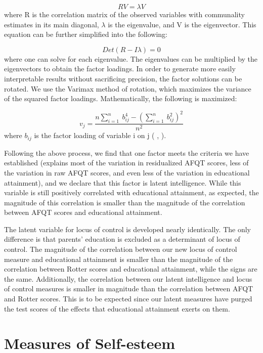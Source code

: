 \documentclass[12pt]{report}
\newcommand{\beq}{\begin{equation}}
\newcommand{\eeq}{\end{equation}}
\newcommand{\citee}[1]{\citename{#1} \citeyear{#1}}
\begin{document}
\beq RV = \lambda V\eeq
where R is the correlation matrix of the observed variables with communality estimates in its main diagonal, $\lambda$ is the eigenvalue, and V is the eigenvector. This equation can be further simplified into the following:

\beq Det(R-I\lambda) = 0\eeq
where one can solve for each eigenvalue. The eigenvalues can be multiplied by the eigenvectors to obtain the factor loadings. In order to generate more easily interpretable results without sacrificing precision, the factor solutions can be rotated. We use the Varimax method of rotation, which maximizes the variance of the squared factor loadings. Mathematically, the following is maximized:

\beq v_j = \frac{n\sum_{i=1}^n\ b_{ij}^4 - (\sum_{i=1}^n\ b_{ij}^2)^2}{n^2}\eeq
where $b_{ij}$ is the factor loading of variable i on j (\citee{KM1978a}, \citee{KM1978b}).

Following the above process, we find that one factor meets the criteria we have established (explains most of the variation in residualized AFQT scores, less of the variation in raw AFQT scores, and even less of the variation in educational attainment), and we declare that this factor is latent intelligence. While this variable is still positively correlated with educational attainment, as expected, the magnitude of this correlation is smaller than the magnitude of the correlation between AFQT scores and educational attainment.

The latent variable for locus of control is developed nearly identically. The only difference is that parents' education is excluded as a determinant of locus of control. The magnitude of the correlation between our new locus of control measure and educational attainment is smaller than the magnitude of the correlation between Rotter scores and educational attainment, while the signs are the same. Additionally, the correlation between our latent intelligence and locus of control measures is smaller in magnitude than the correlation between AFQT and Rotter scores. This is to be expected since our latent measures have purged the test scores of the effects that educational attainment exerts on them.

\section*{Measures of Self-esteem}
\end{document}
